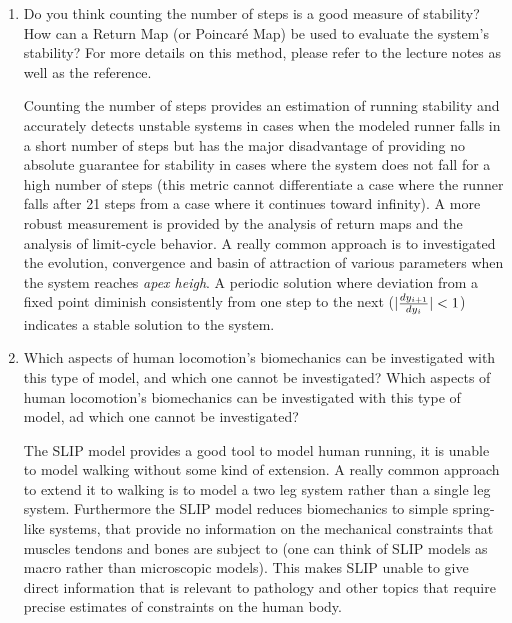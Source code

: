 \documentclass[11pt]{article}
\DeclarePairedDelimiter\abs{\lvert}{\rvert}%
\begin{document}
\begin{enumerate}
    \item Do you think counting the number of steps is a good measure of stability? How can a Return Map (or Poincaré Map) be used to evaluate the system's stability? For more details on this method, please refer to the lecture notes as well as the reference.
    \begin{adjustwidth}{0.5cm}{}
        Counting the number of steps provides an estimation of running stability and accurately detects unstable systems in cases when the modeled runner falls in a short number of steps but has the major disadvantage of providing no absolute guarantee for stability in cases where the system does not fall for a high number of steps (this metric cannot differentiate a case where the runner falls after 21 steps from a case where it continues toward infinity). 
        \BlankLine
        A more robust measurement is provided by the analysis of return maps and the analysis of limit-cycle behavior. A really common approach is to investigated the evolution, convergence and basin of attraction of various parameters when the system reaches \textit{apex heigh}. A periodic solution where deviation from a fixed point diminish consistently from one step to the next ($\abs{\frac{dy_{i+1}}{dy_{i}}} < 1$) indicates a stable solution to the system.
        \[  \]
    \end{adjustwidth}

    \item Which aspects of human locomotion's biomechanics can be investigated with this type of model, and which one cannot be investigated? Which aspects of human locomotion's biomechanics can be investigated with this type of model, ad which one cannot be investigated?
    \begin{adjustwidth}{0.5cm}{}
        The SLIP model provides a good tool to model human running,   it is unable to model walking without some kind of extension. A really common approach to extend it to walking is to model a two leg system rather than a single leg system. 
        \BlankLine
        Furthermore the SLIP model reduces biomechanics to simple spring-like systems, that provide no information on the mechanical constraints that muscles tendons and bones are subject to (one can think of SLIP models as macro rather than microscopic models). This makes SLIP unable to give direct information that is relevant to pathology and other topics that require precise estimates of constraints on the human body.
    \end{adjustwidth}
\end{enumerate}
\end{document}
